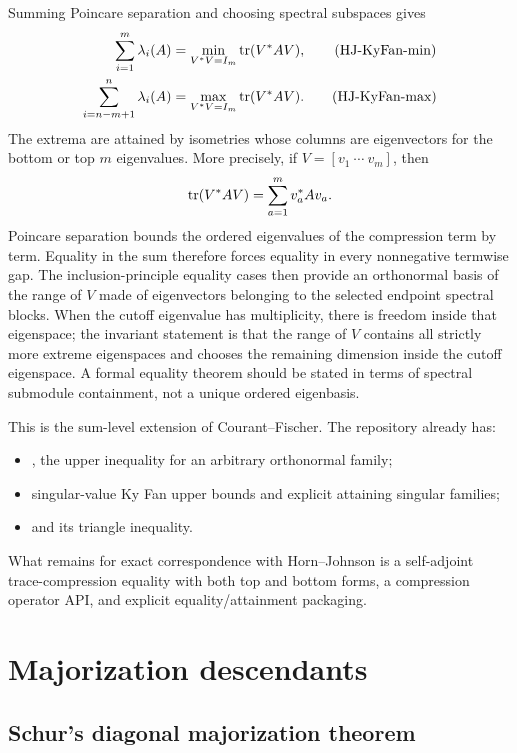 Summing Poincare separation and choosing spectral subspaces gives
\begin{align}
  \sum_{i=1}^m\lambda_i(A)
  &=\min_{V^*V=I_m}\operatorname{tr}(V^*AV), \tag{HJ-KyFan-min}\\
  \sum_{i=n-m+1}^n\lambda_i(A)
  &=\max_{V^*V=I_m}\operatorname{tr}(V^*AV). \tag{HJ-KyFan-max}
\end{align}
The extrema are attained by isometries whose columns are eigenvectors for the bottom or top $m$ eigenvalues. More precisely, if $V=[v_1\ \cdots\ v_m]$, then
\[
  \operatorname{tr}(V^*AV)=\sum_{a=1}^m v_a^*Av_a.
\]
Poincare separation bounds the ordered eigenvalues of the compression term by term. Equality in the sum therefore forces equality in every nonnegative termwise gap. The inclusion-principle equality cases then provide an orthonormal basis of the range of $V$ made of eigenvectors belonging to the selected endpoint spectral blocks. When the cutoff eigenvalue has multiplicity, there is freedom inside that eigenspace; the invariant statement is that the range of $V$ contains all strictly more extreme eigenspaces and chooses the remaining dimension inside the cutoff eigenspace. A formal equality theorem should be stated in terms of spectral submodule containment, not a unique ordered eigenbasis.

This is the sum-level extension of Courant--Fischer. The repository already has:
\begin{itemize}[leftmargin=2em]
\item {}, the upper inequality for an arbitrary orthonormal family;
\item singular-value Ky Fan upper bounds and explicit attaining singular families;
\item {} and its triangle inequality.
\end{itemize}
What remains for exact correspondence with Horn--Johnson is a self-adjoint trace-compression equality with both top and bottom forms, a compression operator API, and explicit equality/attainment packaging.

\section{Majorization descendants}


\subsection{Schur's diagonal majorization theorem}

